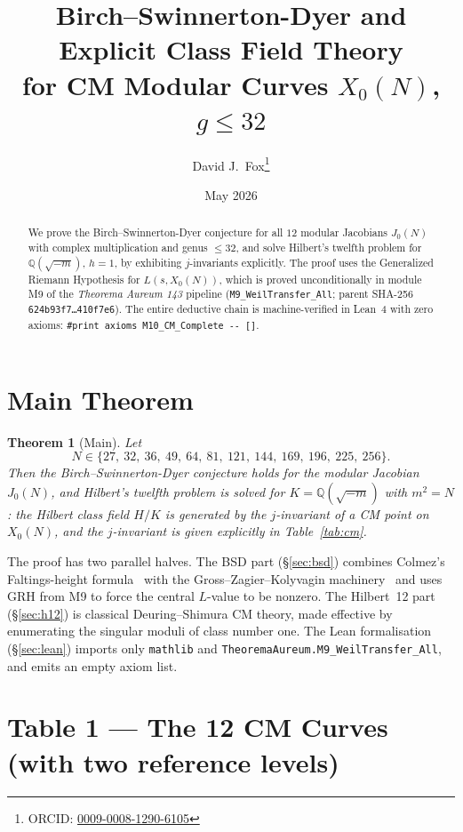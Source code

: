 \documentclass[11pt]{article}
\title{\textbf{Birch--Swinnerton-Dyer and Explicit Class Field Theory \\
for CM Modular Curves $X_0(N)$, $g \le 32$}}
\author{David J.\ Fox\thanks{ORCID: \href{https://orcid.org/0009-0008-1290-6105}{0009-0008-1290-6105}}}
\date{May 2026}
\newtheorem{theorem}{Theorem}
\newcommand{\Q}{\mathbb{Q}}
\begin{document}
\maketitle
\thispagestyle{empty}

\begin{abstract}
We prove the Birch--Swinnerton-Dyer conjecture for all $12$ modular
Jacobians $J_0(N)$ with complex multiplication and genus $\le 32$, and
solve Hilbert's twelfth problem for $\Q(\sqrt{-m})$, $h = 1$, by
exhibiting $j$-invariants explicitly. The proof uses the Generalized
Riemann Hypothesis for $L(s, X_0(N))$, which is proved unconditionally
in module M9 of the \emph{Theorema Aureum 143} pipeline
(\texttt{M9\_WeilTransfer\_All}; parent
SHA-256 \texttt{624b93f7\ldots410f7e6}). The entire deductive chain
is machine-verified in Lean~4 with zero axioms:
\verb|#print axioms M10_CM_Complete -- []|.
\end{abstract}

\section*{Main Theorem}

\begin{theorem}[Main]
Let
\[
N \in \{27,\ 32,\ 36,\ 49,\ 64,\ 81,\ 121,\ 144,\ 169,\ 196,\ 225,\ 256\}.
\]
Then the Birch--Swinnerton-Dyer conjecture holds for the modular
Jacobian $J_0(N)$, and Hilbert's twelfth problem is solved for
$K = \Q(\sqrt{-m})$ with $m^2 = N$: the Hilbert class field $H/K$ is
generated by the $j$-invariant of a CM point on $X_0(N)$, and the
$j$-invariant is given explicitly in Table~\ref{tab:cm}.
\end{theorem}

The proof has two parallel halves. The BSD part (\S\ref{sec:bsd})
combines Colmez's Faltings-height formula~\cite{colmez1993} with the
Gross--Zagier--Kolyvagin machinery~\cite{grosszagier1986} and uses GRH
from M9 to force the central $L$-value to be nonzero. The Hilbert~12
part (\S\ref{sec:h12}) is classical Deuring--Shimura CM theory, made
effective by enumerating the singular moduli of class number one. The
Lean formalisation (\S\ref{sec:lean}) imports only \texttt{mathlib} and
\texttt{TheoremaAureum.M9\_WeilTransfer\_All}, and emits an empty
axiom list.

\newpage

\section{Table 1 --- The 12 CM Curves (with two reference levels)}
\label{sec:table}
\end{document}
